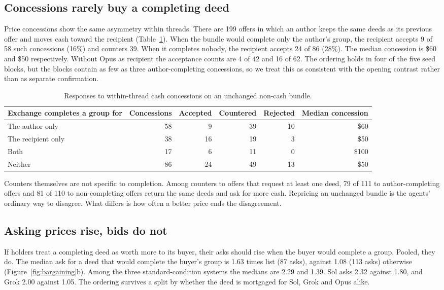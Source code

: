 \subsection{Concessions rarely buy a completing deed}

Price concessions show the same asymmetry within threads. There are 199 offers in which an author keeps the same deeds as its previous offer and moves cash toward the recipient (Table~\ref{tab:concessions}). When the bundle would complete only the author's group, the recipient accepts 9 of 58 such concessions (16\%) and counters 39. When it completes nobody, the recipient accepts 24 of 86 (28\%). The median concession is \$60 and \$50 respectively. Without Opus as recipient the acceptance counts are 4 of 42 and 16 of 62. The ordering holds in four of the five seed blocks, but the blocks contain as few as three author-completing concessions, so we treat this as consistent with the opening contrast rather than as separate confirmation.

\begin{table}[t]
\centering\small
\begin{tabular}{@{}lrrrrr@{}}
\toprule
Exchange completes a group for & Concessions & Accepted & Countered & Rejected & Median concession\\
\midrule
The author only & 58 & 9 & 39 & 10 & \$60\\
The recipient only & 38 & 16 & 19 & 3 & \$50\\
Both & 17 & 6 & 11 & 0 & \$100\\
Neither & 86 & 24 & 49 & 13 & \$50\\
\bottomrule
\end{tabular}
\caption{Responses to within-thread cash concessions on an unchanged non-cash bundle.}
\label{tab:concessions}
\end{table}

Counters themselves are not specific to completion. Among counters to offers that request at least one deed, 79 of 111 to author-completing offers and 81 of 110 to non-completing offers return the same deeds and ask for more cash. Repricing an unchanged bundle is the agents' ordinary way to disagree. What differs is how often a better price ends the disagreement.

\subsection{Asking prices rise, bids do not}

If holders treat a completing deed as worth more to its buyer, their asks should rise when the buyer would complete a group. Pooled, they do. The median ask for a deed that would complete the buyer's group is 1.63 times list (87 asks), against 1.08 (113 asks) otherwise (Figure~\ref{fig:bargaining}b). Among the three standard-condition systems the medians are 2.29 and 1.39. Sol asks 2.32 against 1.80, and Grok 2.00 against 1.05. The ordering survives a split by whether the deed is mortgaged for Sol, Grok and Opus alike.

